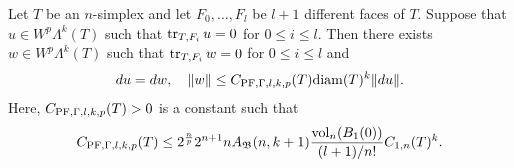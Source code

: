 \documentclass[10pt,letterpaper]{article}
\begin{document}
\begin{lemma}\label{lemma:mixedbconsimplex:exteriorderivative}
    Let $T$ be an $n$-simplex 
    and let $F_{0},\dots,F_{l}$ be $l+1$ different faces of $T$. 
    Suppose that $u \in W^{p}\Lambda^{k}(T)$ such that 
    $\operatorname{tr}_{T,F_i} u = 0$ for $0 \leq i \leq l$.
    Then there exists $w \in W^{p}\Lambda^{k}(T)$ such that 
    $\operatorname{tr}_{T,F_i} w = 0$ for $0 \leq i \leq l$
    and  
    \begin{align*}
        d u = d w,
        \quad 
        \| w \| 
        \leq 
        C_{{\rm PF},\Gamma,l,k,p}(T)
        {\operatorname{diam}}(T)^{k} 
        \| d u \|
        .
    \end{align*}
    Here, $C_{{\rm PF},\Gamma,l,k,p}(T) > 0$ is a constant such that 
    \begin{align*}
        C_{{\rm PF},\Gamma,l,k,p}(T)
        \leq 
        2^{\frac n p}
        2^{n+1} n A_{{\mathfrak B}}(n,k+1) \frac{ \operatorname{vol}_{n}(B_1(0)) }{ (l+1)/n! } 
        C_{1,n}(T)^{k}
        .
    \end{align*}
\end{lemma}
\end{document}
